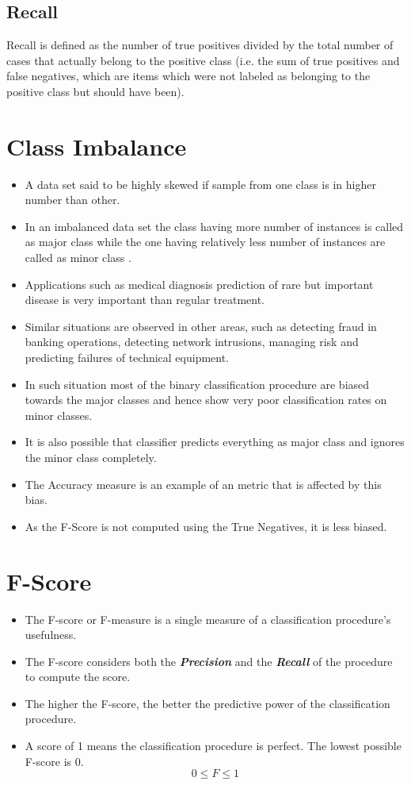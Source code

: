 \documentclass[a4paper,12pt]{article}
\begin{document}
\subsection{Recall}
Recall is defined as the number of true positives divided by the total number of cases that actually
belong to the positive class (i.e. the sum of true positives and false negatives, which are items
which were not labeled as belonging to the positive class but should have been).


\section{Class Imbalance}


\begin{itemize}
	\item  A data set said to be highly skewed if sample from one class is in higher number than other.
	\item  In an imbalanced data set the class having more number of instances is called as major class
	while the one having relatively less number of instances are called as minor class .
	\item  Applications such as medical diagnosis prediction of rare but important disease is very important
	than regular treatment.
	\item  Similar situations are observed in other areas, such as detecting fraud in banking operations,
	detecting network intrusions, managing risk and predicting failures of technical equipment.
	\item  In such situation most of the binary classification procedure are biased towards the major
	classes and hence show very poor classification rates on minor classes.
	\item  It is also possible that classifier predicts everything as major class and ignores the minor class
	completely.
	\item  The Accuracy measure is an example of an metric that is affected by this bias.
	\item  As the F-Score is not computed using the True Negatives, it is less biased.
	
\end{itemize}

\section*{F-Score}	

	\begin{itemize}
		\item The F-score or F-measure is a single measure of a classification procedure's usefulness. 
		\item The F-score considers both the \textit{\textbf{Precision}} and the \textit{\textbf{Recall}} of the procedure to compute the score.
		\item The higher the F-score, the better the predictive power of the 
		classification procedure. 
		\item A score of 1 means the classification procedure is perfect. The lowest possible F-score is 0.
		\[ 0 \leq F \leq 1 \]
	\end{itemize}
\end{document}
